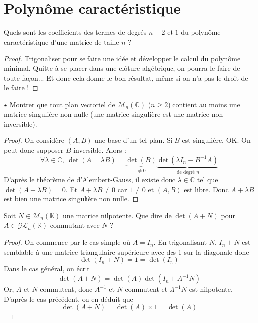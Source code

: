 \documentclass[french,a4paper]{article}
\newcommand{\C}{\mathbb{C}}
\newcommand{\K}{\mathbb{K}}
\newcommand{\inv}{^{-1}}
\theoremstyle{plain}
\theoremstyle{definition}
\theoremstyle{remark}
\begin{document}
\section{Polynôme caractéristique}

\begin{ex}{}
	Quels sont les coefficients des termes de degrés $n-2$ et $1$ du polynôme caractéristique d'une matrice de taille $n$ ?
\end{ex}
\begin{proof}
	Trigonaliser pour se faire une idée et développer le calcul du polynôme minimal. Quitte à se placer dans une clôture algébrique, on pourra le faire de toute façon... Et donc cela donne le bon résultat, même si on n'a pas le droit de le faire !
\end{proof}

\begin{ex}{$\star$}
	Montrer que tout plan vectoriel de $\mathcal{M}_n(\C)$ ($n\geqslant 2$) contient au moins une matrice singulière non nulle (une matrice singulière est une matrice non inversible).
\end{ex}
\begin{proof}
	On considère $(A,B)$ une base d'un tel plan. Si $B$ est singulière, OK. On peut donc supposer $B$ inversible. Alors : $$\forall\lambda\in\C,\ \det(A=\lambda B)=\underbrace{\det(B)}_{\ne 0}\underbrace{\det(\lambda I_n-B\inv A)}_{\text{ de degré }n}$$ D'après le théorème de d'Alembert-Gauss, il existe donc $\lambda\in\C$ tel que $\det(A+\lambda B)=0$. Et $A+\lambda B\ne 0$ car $1\ne 0$ et $(A,B)$ est libre. Donc $A+\lambda B$ est bien une matrice singulière non nulle.
\end{proof}

\begin{ex}{}
	Soit $N\in\mathcal{M}_n(\K)$ une matrice nilpotente. Que dire de $\det(A+N)$ pour $A\in\mathcal{GL}_n(\K)$ commutant avec $N$ ?
\end{ex}
\begin{proof}
	On commence par le cas simple où $A=I_n$. En trigonalisant $N$, $I_n+N$ est semblable à une matrice triangulaire supérieure avec des 1 sur la diagonale donc $$\det(I_n+N)=1=\det(I_n)$$ Dans le cas général, on écrit $$\det(A+N)=\det(A)\det(I_n+A\inv N)$$ Or, $A$ et $N$ commutent, donc $A\inv$ et $N$ commutent et $A\inv N$ est nilpotente. D'après le cas précédent, on en déduit que $$\det(A+N)=\det(A)\times 1=\det(A)$$ 
\end{proof}
\end{document}
